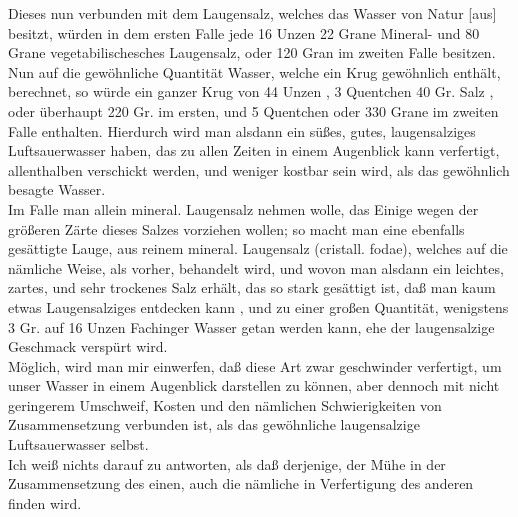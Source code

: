 \documentclass[11pt,a5paper,twoside]{memoir}
\begin{document}
Dieses nun verbunden mit dem Laugensalz, 
welches das Wasser von Natur [aus] besitzt, 
würden in dem ersten Falle jede 16 Unzen 
22 Grane Mineral- 
und 80 Grane vegetabilischesches Laugensalz, 
oder 120 Gran im zweiten Falle besitzen. 
Nun auf die gewöhnliche Quantität Wasser, 
welche ein Krug gewöhnlich enthält, berechnet, 
so würde ein ganzer Krug von 44 Unzen%
, 
3 Quentchen 40 Gr. Salz%
, 
oder überhaupt 220 Gr. im ersten, 
und 5 Quentchen 
oder 330 Grane im zweiten Falle enthalten.
\label{units_value_page}
Hierdurch wird man alsdann ein süßes, gutes, 
laugensalziges Luftsauerwasser haben, 
das zu allen Zeiten in einem Augenblick kann verfertigt, 
allenthalben verschickt werden, 
und weniger kostbar sein wird, 
als das gewöhnlich besagte Wasser.\\

Im Falle man allein mineral. Laugensalz nehmen wolle, 
das Einige wegen der größeren Zärte dieses Salzes vorziehen wollen; 
so macht man eine ebenfalls gesättigte Lauge, 
aus reinem mineral. Laugensalz ({\lattext cristall. fodae}), 
welches auf die nämliche Weise, als vorher, behandelt wird, 
und wovon man alsdann ein leichtes, zartes, 
und sehr trockenes Salz erhält, das so stark gesättigt ist, 
daß man kaum etwas Laugensalziges entdecken kann%
, 
und zu einer großen Quantität, 
wenigstens 3 Gr. auf 16 Unzen Fachinger Wasser getan werden kann, 
ehe der laugensalzige Geschmack verspürt wird.\\

Möglich, wird man mir einwerfen, 
daß diese Art zwar geschwinder verfertigt, 
um unser Wasser in einem Augenblick darstellen zu können, 
aber dennoch mit nicht geringerem Umschweif, 
Kosten und den nämlichen Schwierigkeiten von Zusammensetzung verbunden ist, 
als das gewöhnliche laugensalzige Luftsauerwasser selbst.\\

Ich weiß nichts darauf zu antworten, 
als daß derjenige, der Mühe in der Zusammensetzung des einen, 
auch die nämliche in Verfertigung des anderen finden wird.\\
\end{document}
